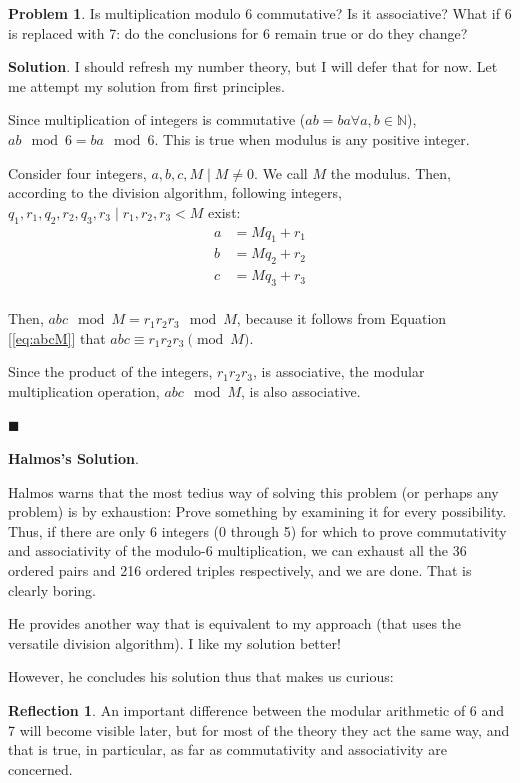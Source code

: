 \documentclass[english,notitlepage,smartquotes]{hgbreport}
\theoremstyle{definition}
\theoremstyle{definition}
\newtheorem{problem}{Problem}
\theoremstyle{remark}
\theoremstyle{plain}
\theoremstyle{definition}
\renewcommand\qedsymbol{$\blacksquare$}
\theoremstyle{definition}
\newtheorem{reflection}{Reflection}
\begin{document}
\begin{problem}
\label{pr:modularmult}
Is multiplication modulo 6 commutative? Is it associative? What if 6 is replaced with 7: do the conclusions for 6 remain true or do they change?
\end{problem}

\textbf{Solution}.
I should refresh my number theory, but I will defer that for now. Let me attempt my solution from first principles.

Since multiplication of integers is commutative ($ab=ba \forall a,b\in\mathbb{N}$), $ab\mod 6=ba\mod 6$. This is true when modulus is any positive integer.

Consider four integers, $a,b,c,M\mid M\ne 0$. We call $M$ the modulus. Then, according to the division algorithm, following integers, $q_1,r_1,q_2,r_2,q_3,r_3\mid r_1,r_2,r_3<M$ exist:
\begin{equation}
\!
\begin{aligned}
a &= Mq_1+r_1\\
b &= Mq_2+r_2\\
c &= Mq_3+r_3\\
\end{aligned}\label{eq:abcM}
\end{equation}

Then, $abc\mod M=r_1r_2r_3\mod M$, because it follows from Equation [\ref{eq:abcM}] that $abc\equiv r_1r_2r_3 \pmod{M}$.

Since the product of the integers, $r_1r_2r_3$, is associative, the modular multiplication operation, $abc\mod M$, is also associative.

\qedsymbol

\textbf{Halmos's Solution}.

Halmos warns that the most tedius way of solving this problem (or perhaps any problem) is by exhaustion: Prove something by examining it for every possibility. Thus, if there are only 6 integers (0 through 5) for which to prove commutativity and associativity of the modulo-6 multiplication, we can exhaust all the 36 ordered pairs and 216 ordered triples respectively, and we are done. That is clearly boring.

He provides another way that is equivalent to my approach (that uses the versatile division algorithm). I like my solution better!

However, he concludes his solution thus that makes us curious:
\begin{reflection}
An important difference between the modular arithmetic of 6 and 7 will
become visible later, but for most of the theory they act the same way, and that
is true, in particular, as far as commutativity and associativity are concerned.
\end{reflection}
\end{document}
